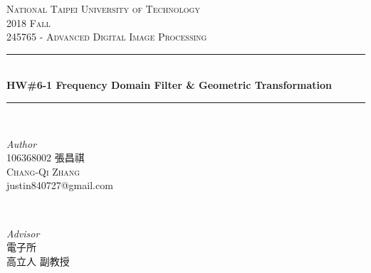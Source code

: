 \begin{titlepage} %
	\newcommand{\HRule}{\rule{\linewidth}{0.5mm}} %
		
	\center %
		
		
	\textsc{\LARGE National Taipei University of Technology}\\[1.5cm] %
		
	\textsc{\Large 2018 Fall}\\[0.5cm] %
		
	\textsc{\large 245765 - Advanced Digital Image Processing}\\[0.5cm] %
		
		
	\HRule\\[0.4cm]
		
	{\huge\bfseries HW\#6-1 Frequency Domain Filter \& Geometric Transformation}\\[0.4cm] %
		
	\HRule\\[1.5cm]
		
	\begin{CJK}{UTF8}{bsmi}
		\begin{minipage}{0.4\textwidth}
			\begin{flushleft}
				\large
				\textit{Author}\\
				106368002 張昌祺\\ 
				\textsc{Chang-Qi Zhang} \\
				justin840727@gmail.com %
			\end{flushleft}
		\end{minipage}
		~
		\begin{minipage}{0.4\textwidth}
			\begin{flushright}
				\large
				\textit{Advisor}\\
				電子所 \\
				高立人 副教授 %
			\end{flushright}
		\end{minipage}
	\end{CJK}
		

\end{titlepage}
